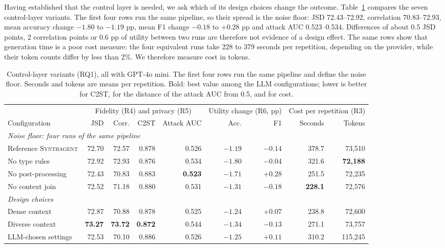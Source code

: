 \documentclass[conference]{IEEEtran}
\newcommand{\system}{\textsc{Synthagent}\xspace}
\newcommand{\best}[1]{\textbf{#1}}
\begin{document}
Having established that the control layer is needed, we ask which of its design choices change the outcome. Table~\ref{tab:ablation} compares the seven control-layer variants. The first four rows run the same pipeline, so their spread is the noise floor: JSD 72.43--72.92, correlation 70.83--72.93, mean accuracy change $-1.80$ to $-1.19$ pp, mean F1 change $-0.18$ to $+0.28$ pp and attack AUC 0.523--0.534. Differences of about 0.5 JSD points, 2 correlation points or 0.6 pp of utility between two runs are therefore not evidence of a design effect. The same rows show that generation time is a poor cost measure: the four equivalent runs take 228 to 379 seconds per repetition, depending on the provider, while their token counts differ by less than 2\%. We therefore measure cost in tokens.

\begin{table}[t]
\centering
\caption{Control-layer variants (RQ1), all with GPT-4o mini. The first four rows run the same pipeline and define the noise floor. Seconds and tokens are means per repetition. Bold: best value among the LLM configurations; lower is better for C2ST, for the distance of the attack AUC from 0.5, and for cost.}
\label{tab:ablation}
\footnotesize
\begin{tabular*}{\textwidth}{@{\extracolsep{\fill}}lrrrrrrrr@{}}
\toprule
& \multicolumn{4}{c}{Fidelity (R4) and privacy (R5)} & \multicolumn{2}{c}{Utility change (R6, pp)} & \multicolumn{2}{c}{Cost per repetition (R3)} \\
\cmidrule(lr){2-5}\cmidrule(lr){6-7}\cmidrule(l){8-9}
Configuration & JSD & Corr. & C2ST & Attack AUC & Acc. & F1 & Seconds & Tokens \\
\midrule
\multicolumn{9}{l}{\textit{Noise floor: four runs of the same pipeline}}\\
Reference \system & 72.70 & 72.57 & 0.878 & 0.526 & \best{$-1.19$} & $-0.14$ & 378.7 & 73,510 \\
No type rules & 72.92 & 72.93 & 0.876 & 0.534 & $-1.80$ & $-0.04$ & 321.6 & \best{72,188} \\
No post-processing & 72.43 & 70.83 & 0.883 & \best{0.523} & $-1.71$ & \best{$+0.28$} & 251.5 & 72,235 \\
No context join & 72.52 & 71.18 & 0.880 & 0.531 & $-1.31$ & $-0.18$ & \best{228.1} & 72,576 \\
\midrule
\multicolumn{9}{l}{\textit{Design choices}}\\
Dense context & 72.87 & 70.88 & 0.878 & 0.525 & $-1.24$ & $+0.07$ & 238.8 & 72,600 \\
Diverse context & \best{73.27} & \best{73.72} & \best{0.872} & 0.544 & $-1.34$ & $-0.13$ & 271.1 & 73,757 \\
LLM-chosen settings & 72.53 & 70.10 & 0.886 & 0.526 & $-1.25$ & $+0.11$ & 310.2 & 115,245 \\
\bottomrule
\end{tabular*}
\end{table}
\end{document}
